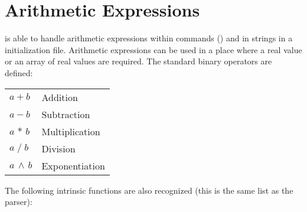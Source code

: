 \section{Arithmetic Expressions}
\label{s:arithmetic.exp}

\tao is able to handle arithmetic expressions within commands () and in strings in a
\tao initialization file.  Arithmetic expressions can be used in a place where a real value or an
array of real values are required.  The standard binary operators are defined: \hfil\break \hspace*{0.15in}
\begin{tabular}{ll}
  $a + b$           & Addition        \\
  $a - b$           & Subtraction     \\
  $a \, \ast \, b$  & Multiplication  \\
  $a \; / \; b$     & Division        \\
  $a \, \land \, b$ & Exponentiation  \\
\end{tabular} \newline
The following intrinsic functions are also recognized (this is the same list as the \bmad parser):
\hfil\break
{}
\hspace*{0.15in}
